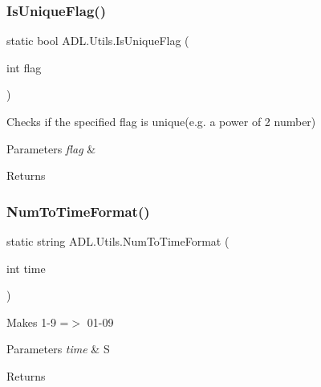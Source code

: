 \subsubsection{\texorpdfstring{Is\+Unique\+Flag()}{IsUniqueFlag()}}
{\footnotesize\ttfamily static bool A\+D\+L.\+Utils.\+Is\+Unique\+Flag (\begin{DoxyParamCaption}\item[{int}]{flag }\end{DoxyParamCaption})\hspace{0.3cm}{\ttfamily [static]}}



Checks if the specified flag is unique(e.\+g. a power of 2 number) 


\begin{DoxyParams}{Parameters}
{\em flag} & \\
\hline
\end{DoxyParams}
\begin{DoxyReturn}{Returns}

\end{DoxyReturn}
\mbox{\label{class_a_d_l_1_1_utils_a7f8a756ce7c6c8d4cfe7126ef534e151}} 
\subsubsection{\texorpdfstring{Num\+To\+Time\+Format()}{NumToTimeFormat()}}
{\footnotesize\ttfamily static string A\+D\+L.\+Utils.\+Num\+To\+Time\+Format (\begin{DoxyParamCaption}\item[{int}]{time }\end{DoxyParamCaption})\hspace{0.3cm}{\ttfamily [static]}}



Makes 1-\/9 =$>$ 01-\/09 


\begin{DoxyParams}{Parameters}
{\em time} & S\\
\hline
\end{DoxyParams}
\begin{DoxyReturn}{Returns}

\end{DoxyReturn}
\mbox{\label{class_a_d_l_1_1_utils_ac01ab97bc36cb231f4f06cadce9b2aa5}} 

